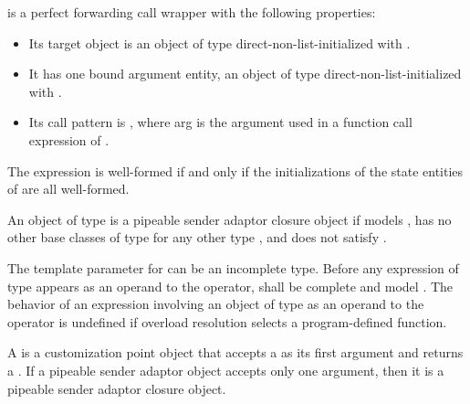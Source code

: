  is a perfect forwarding call wrapper
with the following properties:
\begin{itemize}
\item
Its target object is an object  of type 
direct-non-list-initialized with .
\item
It has one bound argument entity,
an object  of type 
direct-non-list-initialized with .
\item
Its call pattern is ,
where arg is the argument used in a function call expression of .
\end{itemize}
The expression  is well-formed if and only if
the initializations of the state entities of 
are all well-formed.

\pnum
An object  of type  is
a pipeable sender adaptor closure object
if  models ,
 has no other base classes
of type  for any other type , and
 does not satisfy .

\pnum
The template parameter  for  can be
an incomplete type.
Before any expression of type \cv{}  appears as
an operand to the \tcode{|} operator,
 shall be complete and
model .
The behavior of an expression involving an object of type \cv{} 
as an operand to the \tcode{|} operator is undefined
if overload resolution selects a program-defined  function.

\pnum
A  is a customization point object
that accepts a  as its first argument and
returns a .
If a pipeable sender adaptor object accepts only one argument,
then it is a pipeable sender adaptor closure object.

